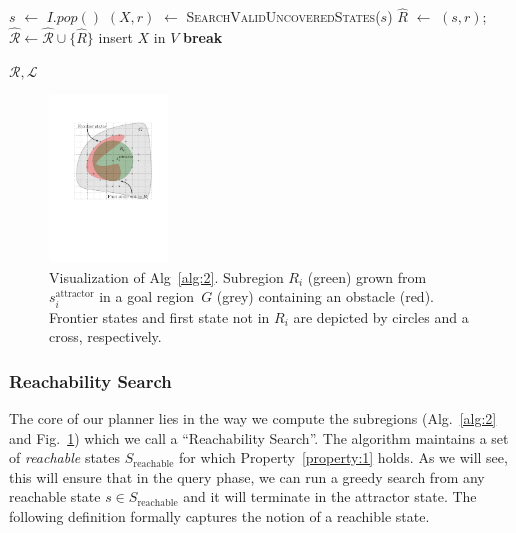 \documentclass[letterpaper]{article} %
\newcommand{\calL}{\ensuremath{\mathcal{L}}\xspace}
\newcommand{\calR}{\ensuremath{\mathcal{R}}\xspace}
\newcommand{\sAttract}{\ensuremath{s^{\text{attractor}}_i}\xspace}
\begin{document}
\begin{algorithm}[t]
\begin{algorithmic}[1]
\vspace{2mm}        
        
         \label{alg:1:iv_loop}
            \State $s$ $\leftarrow$ $I.pop()$
			\If {$\nexists R \in \calR \cup \hat{\calR}$ s.t. $s \in R$ }      
\State $(X, r)$ $\leftarrow$ \textsc{SearchValidUncoveredStates}($s$)
                \State $\hat{R}$ $\leftarrow$ $(s,r)$;
				\hspace{2mm}
				$\hat{\calR} \leftarrow \hat{\calR} \cup \{ \hat{R} \}$   \label{alg:1:iv_region}
                    \label{alg:1:x_states}
                    \State insert $X$ in $V$
                    \State \textbf{break} \label{alg:1:break}
                \EndIf
            \EndIf
        \EndWhile
    \EndWhile

  \vspace{2mm}

  \State \Return $\calR, \calL$
\EndProcedure
\end{algorithmic}
\end{algorithm}

\begin{figure}[tb]
  \centering
  	\includegraphics[width=0.28\textwidth]{Alg2.pdf}
  \caption{
  Visualization of Alg~\ref{alg:2}. Subregion $R_i$ (green) grown from $\sAttract$ in a goal region~$G$ (grey) containing an obstacle (red).
  Frontier states  and first state not in $R_i$ are depicted by circles and a cross, respectively.
}
   	\label{fig:alg2}
\end{figure}

\subsubsection{Reachability Search}
The core of our planner lies in the way we compute the subregions (Alg.~\ref{alg:2} and Fig.~\ref{fig:alg2}) which we call a ``Reachability Search''. The algorithm maintains a set of \emph{reachable} states $S_{\text{reachable}}$ for which Property~\ref{property:1} holds.
As we will see, this will ensure that in the query phase, we can run a greedy search from any reachable state $s \in S_{\text{reachable}}$ and it will terminate in the attractor state. 
%
The following definition formally captures the notion of a reachible state.
\end{document}
